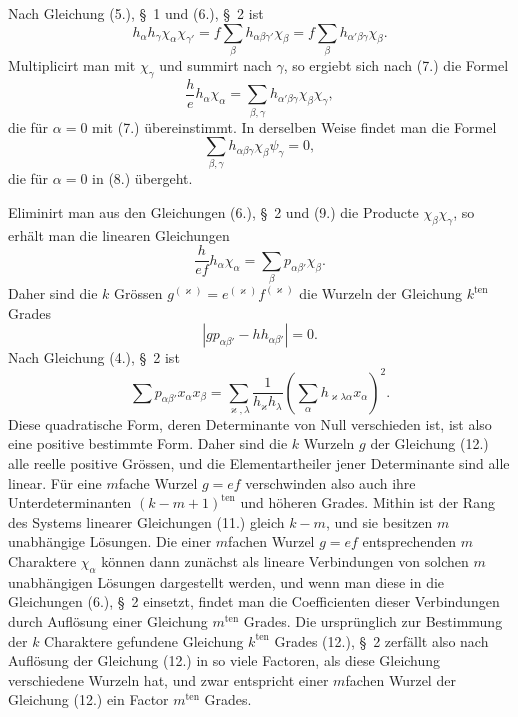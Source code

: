 \documentclass[11pt]{article}
\begin{document}
Nach Gleichung (5.), \S~1 und (6.), \S~2 ist
\[
h_\alpha h_\gamma\chi_\alpha\chi_{\gamma'}=f\sum_\beta h_{\alpha\beta\gamma'}\chi_\beta=f\sum_\beta h_{\alpha'\beta\gamma}\chi_\beta.
\]
Multiplicirt man mit $\chi_\gamma$ und summirt nach $\gamma$, so ergiebt sich nach (7.) die Formel
\begin{equation*}\tag{9.}
\frac{h}{e}h_\alpha\chi_\alpha=\sum_{\beta,\gamma}h_{\alpha'\beta\gamma}\chi_\beta\chi_\gamma,
\end{equation*}
die für $\alpha=0$ mit (7.) übereinstimmt. In derselben Weise findet man die Formel
\begin{equation*}\tag{10.}
\sum_{\beta,\gamma}h_{\alpha\beta\gamma}\chi_\beta\psi_\gamma=0,
\end{equation*}
die für $\alpha=0$ in (8.) übergeht.

Eliminirt man aus den Gleichungen (6.), \S~2 und (9.) die Producte $\chi_\beta\chi_\gamma$, so erhält man die linearen Gleichungen
\begin{equation*}\tag{11.}
\frac{h}{ef}h_\alpha\chi_\alpha=\sum_\beta p_{\alpha\beta'}\chi_\beta.
\end{equation*}
Daher sind die $k$ Grössen $g^{(\varkappa)}=e^{(\varkappa)}f^{(\varkappa)}$ die Wurzeln der Gleichung $k^{\text{ten}}$ Grades
\begin{equation*}\tag{12.}
\left|g p_{\alpha\beta'}-h h_{\alpha\beta'}\right|=0.
\end{equation*}
Nach Gleichung (4.), \S~2 ist
\begin{equation*}\tag{13.}
\sum p_{\alpha\beta'}x_\alpha x_\beta=\sum_{\varkappa,\lambda}\frac{1}{h_\varkappa h_\lambda}\left(\sum_\alpha h_{\varkappa\lambda\alpha}x_\alpha\right)^2.
\end{equation*}
Diese quadratische Form, deren Determinante von Null verschieden ist, ist also eine positive bestimmte Form. Daher sind die $k$ Wurzeln $g$ der Gleichung (12.) alle reelle positive Grössen, und die Elementartheiler jener Determinante sind alle linear. Für eine $m$fache Wurzel $g=ef$ verschwinden also auch ihre Unterdeterminanten $(k-m+1)^{\text{ten}}$ und höheren Grades. Mithin ist der Rang des Systems linearer Gleichungen (11.) gleich $k-m$, und sie besitzen $m$ unabhängige Lösungen. Die einer $m$fachen Wurzel $g=ef$ entsprechenden $m$ Charaktere $\chi_\alpha$ können dann zunächst als lineare Verbindungen von solchen $m$ unabhängigen Lösungen dargestellt werden, und wenn man diese in die Gleichungen (6.), \S~2 einsetzt, findet man die Coefficienten dieser Verbindungen durch Auflösung einer Gleichung $m^{\text{ten}}$ Grades. Die ursprünglich zur Bestimmung der $k$ Charaktere gefundene Gleichung $k^{\text{ten}}$ Grades (12.), \S~2 zerfällt also nach Auflösung der Gleichung (12.) in so viele Factoren, als diese Gleichung verschiedene Wurzeln hat, und zwar entspricht einer $m$fachen Wurzel der Gleichung (12.) ein Factor $m^{\text{ten}}$ Grades.
\end{document}
